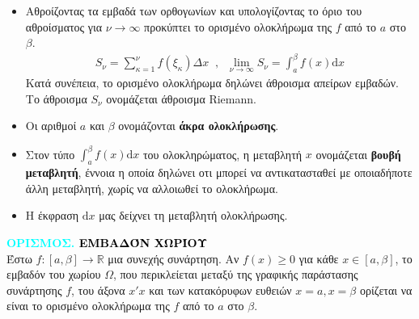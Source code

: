 \documentclass[twoside,10pt]{book}
\newcounter{orismos}[chapter]
\renewcommand{\theorismos}{\thechapter.\arabic{orismos}}
\newcommand{\Orismos}[1]{\refstepcounter{orismos}\textcolor{cyan}{\textbf{ΟΡΙΣΜΟΣ\hspace{2mm}\theorismos\hspace{1mm} \textcolor{black}{\MakeUppercase{#1}}}}\\}{}
\begin{document}
\begin{itemize}[itemsep=0mm]
\begin{center}
\end{center}
\item Αθροίζοντας τα εμβαδά των ορθογωνίων και υπολογίζοντας το όριο του αθροίσματος για $ \nu\rightarrow\infty $ προκύπτει το ορισμένο ολοκλήρωμα της $ f $ από το $ a $ στο $ \beta $.
\begin{gather*}
S_\nu=\sum_{\kappa=1}^{\nu}f(\xi_\kappa)\varDelta x\;\;,\;\;
\lim_{\nu\rightarrow\infty}S_\nu=\int_{a}^{\beta}f(x)\mathrm{d}x
\end{gather*}
Κατά συνέπεια, το ορισμένο ολοκλήρωμα δηλώνει άθροισμα απείρων εμβαδών. Το άθροισμα $ S_\nu $ ονομάζεται άθροισμα Riemann.
\item Οι αριθμοί $ a $ και $ \beta $ ονομάζονται \textbf{άκρα ολοκλήρωσης}.
\item Στον τύπο $ \int_{a}^{\beta}f(x)\mathrm{d}x $ του ολοκληρώματος, η μεταβλητή $ x $ ονομάζεται \textbf{βουβή μεταβλητή}, έννοια η οποία δηλώνει οτι μπορεί να αντικατασταθεί με οποιαδήποτε άλλη μεταβλητή, χωρίς να αλλοιωθεί το ολοκλήρωμα.
\item Η έκφραση $ \mathrm{d}x $ μας δείχνει τη μεταβλητή ολοκλήρωσης.
\end{itemize}
\Orismos{Εμβαδόν χωρίου}
Έστω $ f:[a,\beta]\rightarrow\mathbb{R} $ μια συνεχής συνάρτηση. Αν $ f(x)\geq0 $ για κάθε $ x\in[a,\beta] $, το εμβαδόν του χωρίου $ \varOmega $, που περικλείεται μεταξύ της γραφικής παράστασης συνάρτησης $ f $, του άξονα $ x'x $ και των κατακόρυφων ευθειών $ x=a, x=\beta $ ορίζεται να είναι το ορισμένο ολοκλήρωμα της $ f $ από το $ a $ στο $ \beta $.
\end{document}
